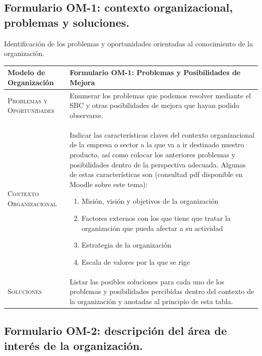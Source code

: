 \documentclass[12pt,a4paper,twoside,spanish]{article}      %
\begin{document}
\subsection{Formulario OM-1: contexto organizacional, problemas y soluciones.}

Identificación de los problemas y oportunidades orientadas al conocimiento de la organización.


\begin{table}[H]
\scriptsize
\begin{tabularx}{\textwidth}{|l|X|} \hline
\textbf{Modelo de Organización} & \textbf{Formulario OM-1: Problemas y Posibilidades de Mejora} \\ \hline\hline

\textsc{Problemas y Oportunidades} & Enumerar los problemas que podemos resolver mediante el SBC y otras posibilidades de mejora que hayan podido observarse.  \\ \hline
\textsc{Contexto Organizacional} & Indicar las características claves del contexto organizacional de la empresa o sector a la que va a ir destinado nuestro producto, así como colocar los
anteriores problemas y posibilidades dentro de la perspectiva adecuada.
Algunas de estas características son (consultad pdf disponible en Moodle sobre este tema):
\begin{enumerate}
    \item Misión, visión y objetivos de la organización 
    \item Factores externos con los que tiene que tratar la organización que pueda afectar a su actividad
    \item Estrategia de la organización
    \item Escala de valores por la que se rige
\end{enumerate}    \\ \hline
\textsc{Soluciones} & Listar las posibles soluciones para cada uno de los problemas y posibilidades percibidas
dentro del contexto de la organización y anotadas al principio de esta tabla. \\
\hline
\end{tabularx}
  \label{tab.OM1}
\end{table}


\pagebreak
\subsection{Formulario OM-2: descripción del área de interés de la organización.}
\end{document}
